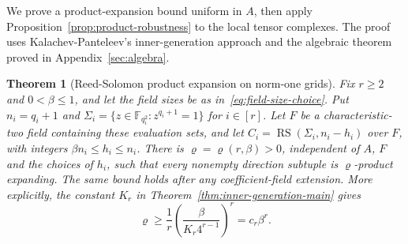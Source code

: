 \documentclass[11pt,letterpaper]{article}
\renewcommand{\le}{\leqslant}
\renewcommand{\ge}{\geqslant}
\newtheorem{theorem}{Theorem}[section]
\theoremstyle{definition}
\theoremstyle{remark}
\newcommand{\F}{\mathbb F}
\newcommand{\RS}{\operatorname{RS}}
\begin{document}
We prove a product-expansion bound uniform in $A$, then apply
Proposition~\ref{prop:product-robustness} to the local tensor complexes.
The proof uses Kalachev-Panteleev's inner-generation approach
\cite[Section~III-B and Lemma~19]{KalachevPanteleev2025}
and the algebraic theorem proved in Appendix~\ref{sec:algebra}.

\begin{theorem}[Reed-Solomon product expansion on norm-one grids]
\label{thm:rs-product-expansion}\label{lem:rs-product-expansion}
Fix $r\ge2$ and $0<\beta\le1$, and let the field sizes be as
in~\eqref{eq:field-size-choice}. Put $n_i=q_i+1$ and
$\Sigma_i=\{z\in\F_{q_i^2}:z^{q_i+1}=1\}$ for $i\in[r]$.
Let $F$ be a characteristic-two field containing these evaluation sets,
and let $C_i=\RS(\Sigma_i,n_i-h_i)$ over $F$, with integers
$\beta n_i\le h_i\le n_i$.
There is $\varrho=\varrho(r,\beta)>0$, independent of $A$, $F$ and the
choices of $h_i$, such that every nonempty direction subtuple is
$\varrho$-product expanding. The same bound holds after any
coefficient-field extension. More explicitly, the constant $K_r$ in
Theorem~\ref{thm:inner-generation-main} gives
\[
 \varrho\ge\frac1r
 \left(\frac{\beta}{K_r4^{r-1}}\right)^r
 =c_r\beta^r.
\]
\end{theorem}
\end{document}
